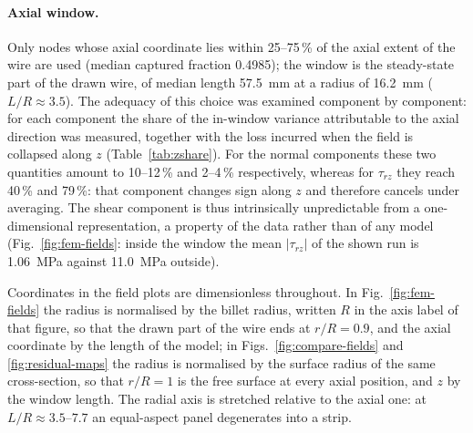 \documentclass[subscriptcorrection,upint,varvw,barcolor=Goldenrod3,mathalfa=cal=euler,balance,hyphenate,french,pdf-a]{asmejour} %
\begin{document}
\paragraph{Axial window.}
Only nodes whose axial coordinate lies within 25--75\,\% of the axial extent of the wire are used (median captured fraction 0.4985); the window is the steady-state part of the drawn wire, of median length 57.5~mm at a radius of 16.2~mm ($L/R \approx 3.5$). %
The adequacy of this choice was examined component by component: for each component the share of the in-window variance attributable to the axial direction was measured, together with the loss incurred when the field is collapsed along $z$ (Table~\ref{tab:zshare}). For the normal components these two quantities amount to 10--12\,\% and 2--4\,\% respectively, whereas for $\tau_{rz}$ they reach 40\,\% and 79\,\%: that component changes sign along $z$ and therefore cancels under averaging. %
The shear component is thus intrinsically unpredictable from a one-dimensional representation, a property of the data rather than of any model (Fig.~\ref{fig:fem-fields}: inside the window the mean $|\tau_{rz}|$ of the shown run is 1.06~MPa against 11.0~MPa outside). %

Coordinates in the field plots are dimensionless throughout. In Fig.~\ref{fig:fem-fields} the radius is normalised by the billet radius, written $R$ in the axis label of that figure, so that the drawn part of the wire ends at $r/R = 0.9$, and the axial coordinate by the length of the model; %
in Figs.~\ref{fig:compare-fields} and \ref{fig:residual-maps} the radius is normalised by the surface radius of the same cross-section, so that $r/R = 1$ is the free surface at every axial position, and $z$ by the window length. %
The radial axis is stretched relative to the axial one: at $L/R \approx 3.5$--$7.7$ an equal-aspect panel degenerates into a strip. %
\end{document}
